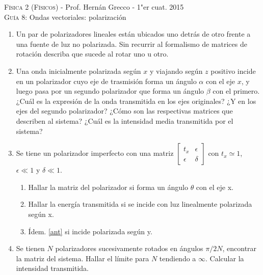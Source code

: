\documentclass[11pt,spanish,a4paper]{article}
\begin{document}
\begin{center}
    \textsc{\large Física 2 (Físicos)} - Prof. Hernán Grecco - 1"er cuat. 2015\\
	\textsc{\large Guía 8:}	Ondas vectoriales: polarización
\end{center}



\begin{enumerate}

\item Un par de polarizadores lineales están ubicados uno detrás de otro frente a una fuente de luz no polarizada.
	Sin recurrir al formalismo de matrices de rotación describa que sucede al rotar uno u otro.


\item Una onda inicialmente polarizada según \(x\) y viajando según \(z\) positivo incide en un polarizador cuyo eje de trasmisión forma un ángulo \(\alpha\) con el eje \(x\), y luego pasa por un segundo polarizador que forma un ángulo \(\beta\) con el primero.
¿Cuál es la expresión de la onda transmitida en los ejes originales?
¿Y en los ejes del segundo polarizador?
¿Cómo son las respectivas matrices que describen al sistema?
¿Cuál es la intensidad media transmitida por el sistema?


\item Se tiene un polarizador imperfecto con una matriz
\(
	\begin{bmatrix}
		t_x  & \epsilon \\
		\epsilon & \delta
	\end{bmatrix}
\)
con \(t_x \simeq 1\), \(\epsilon \ll 1 \) y \(\delta \ll 1 \).
\begin{enumerate}
	\item Hallar la matriz del polarizador si forma un ángulo \(\theta \) con el eje x.
	\item \label{ant} Hallar la energía transmitida si se incide con luz linealmente polarizada según x.
	\item Ídem. \ref{ant} si incide polarizada según y.
\end{enumerate}


\item Se tienen \(N\) polarizadores sucesivamente rotados en ángulos \(\pi/ 2N\), encontrar la matriz del sistema.
Hallar el límite para \(N\) tendiendo a \(\infty\).
Calcular la intensidad transmitida.



\end{enumerate}
\end{document}
